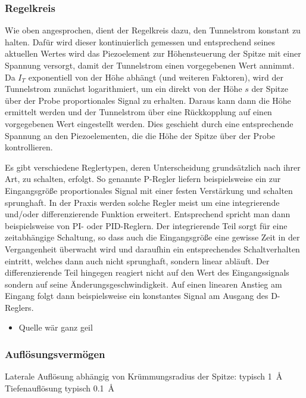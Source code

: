 \documentclass[10pt, a4paper]{article}
\begin{document}
\subsubsection{Regelkreis}

Wie oben angesprochen, dient der Regelkreis dazu, den Tunnelstrom konstant zu halten.
Dafür wird dieser kontinuierlich gemessen und entsprechend seines aktuellen Wertes wird das Piezoelement zur Höhensteuerung der Spitze mit einer Spannung versorgt, damit der Tunnelstrom einen vorgegebenen Wert annimmt.
Da $I_T$ exponentiell von der Höhe abhängt (und weiteren Faktoren), wird der Tunnelstrom zunächst logarithmiert, um ein direkt von der Höhe $s$ der Spitze über der Probe proportionales Signal zu erhalten.
Daraus kann dann die Höhe ermittelt werden und der Tunnelstrom über eine Rückkopplung auf einen vorgegebenen Wert eingestellt werden. 
Dies geschieht durch eine entsprechende Spannung an den Piezoelementen, die die Höhe der Spitze über der Probe kontrollieren.

Es gibt verschiedene Reglertypen, deren Unterscheidung grundsätzlich nach ihrer Art, zu schalten, erfolgt.
So genannte P-Regler liefern beispielsweise ein zur Eingangsgröße proportionales Signal mit einer festen Verstärkung und schalten sprunghaft.
In der Praxis werden solche Regler meist um eine integrierende und/oder differenzierende Funktion erweitert. Entsprechend spricht man dann beispielsweise von PI- oder PID-Reglern.
Der integrierende Teil sorgt für eine zeitabhängige Schaltung, so dass auch die Eingangsgröße eine gewisse Zeit in der Vergangenheit überwacht wird und daraufhin ein entsprechendes Schaltverhalten eintritt, welches dann auch nicht sprunghaft, sondern linear abläuft.
Der differenzierende Teil hingegen reagiert nicht auf den Wert des Eingangssignals sondern auf seine Änderungsgeschwindigkeit.
Auf einen linearen Anstieg am Eingang folgt dann beispielsweise ein konstantes Signal am Ausgang des D-Reglers.

\begin{itemize}
\item Quelle wär ganz geil
\end{itemize}

\subsubsection{Auflösungsvermögen}
Laterale Auflösung abhängig von Krümmungsradius der Spitze: typisch \SI{1}{\angstrom}
Tiefenauflösung typisch \SI{0,1}{\angstrom}
\end{document}

